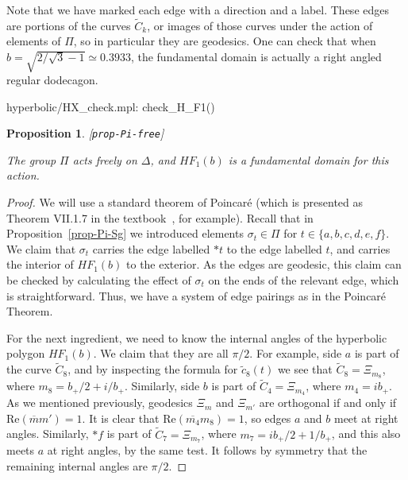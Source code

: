 \documentclass[reqno]{amsart}
\newcommand{\lbl}[1]{\label{#1}\textup{[\texttt{#1}]}\par}
\newcommand{\lbl}{\label}
\newcommand{\Dl}        {\Delta}
\newcommand{\sg}        {\sigma}
\newcommand{\ov}[1]     {\overline{#1}}
\newcommand{\tC}	{\widetilde{C}}
\newcommand{\tc}	{\widetilde{c}}
\renewcommand{\:}{\colon}
\newtheorem{proposition}[theorem]{Proposition}
\theoremstyle{definition}
\begin{document}
Note that we have marked each edge with a direction and a label.
These edges are portions of the curves $\tC_k$, or images of those
curves under the action of elements of $\Pi$, so in particular they
are geodesics.  One can check that when
$b=\sqrt{2/\sqrt{3}-1}\simeq 0.3933$, the fundamental domain is
actually a right angled regular dodecagon.
\begin{checks}
 hyperbolic/HX_check.mpl: check_H_F1()
\end{checks}

\begin{proposition}\lbl{prop-Pi-free}
 The group $\Pi$ acts freely on $\Dl$, and $HF_1(b)$ is a fundamental
 domain for this action.
\end{proposition}
\begin{proof}
 We will use a standard theorem of Poincar\'e (which is presented as
 Theorem VII.1.7 in the textbook~\cite{iv:hg}, for example).
 Recall that in Proposition~\ref{prop-Pi-Sg} we introduced elements
 $\sg_t\in\Pi$ for $t\in\{a,b,c,d,e,f\}$.  We claim that $\sg_t$
 carries the edge labelled $*t$ to the edge labelled $t$, and carries
 the interior of $HF_1(b)$ to the exterior.  As the edges are geodesic,
 this claim can be checked by calculating the effect of $\sg_t$ on the
 ends of the relevant edge, which is straightforward.  Thus, we have a
 system of edge pairings as in the Poincar\'e Theorem.

 For the next ingredient, we need to know the internal angles of the
 hyperbolic polygon $HF_1(b)$.  We claim that they are all $\pi/2$.  For
 example, side $a$ is part of the curve $\tC_8$, and by inspecting the
 formula for $\tc_8(t)$ we see that $\tC_8=\Xi_{m_8}$, where
 $m_8=b_+/2+i/b_+$.  Similarly, side $b$ is part of $\tC_4=\Xi_{m_4}$,
 where $m_4=ib_+$.  As we mentioned previously, geodesics $\Xi_m$ and
 $\Xi_{m'}$ are orthogonal if and only if $\text{Re}(\ov{m}m')=1$.  It
 is clear  that $\text{Re}(\ov{m_4}m_8)=1$, so edges $a$ and $b$ meet
 at right angles.  Similarly, $*f$ is part of $\tC_7=\Xi_{m_7}$, where
 $m_7=ib_+/2+1/b_+$, and this also meets $a$ at right angles, by the same
 test.  It follows by symmetry that the remaining internal angles are
 $\pi/2$.


\end{proof}
\end{document}
